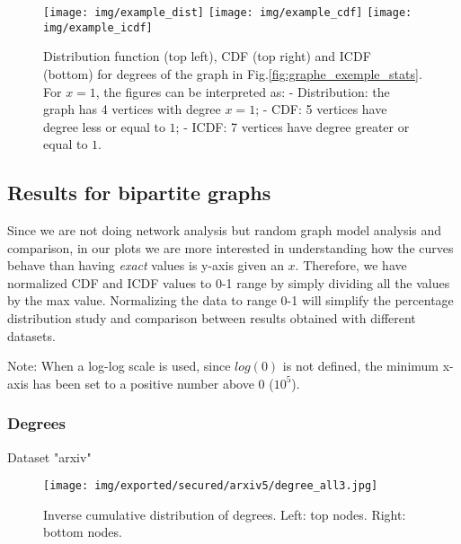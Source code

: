 \documentclass[table]{report}
\begin{document}
\begin{figure}[htp]
\centering
\texttt{[image: img/example\_dist]}\hfill
\texttt{[image: img/example\_cdf]}\hfill
\texttt{[image: img/example\_icdf]}

\caption{Distribution function (top left), CDF (top right) and ICDF (bottom) for degrees of the graph in Fig.\ref{fig:graphe_exemple_stats}. For $x=1$, the figures can be interpreted as: - Distribution: the graph has 4 vertices with degree $x=1$; - CDF: 5 vertices have degree less or equal to $1$; - ICDF: 7 vertices have degree greater or equal to $1$. }
\label{fig:figure3}

\end{figure}

\newpage
\subsection{Results for bipartite graphs}

Since we are not doing network analysis but random graph model analysis and comparison, in our plots we are more interested in understanding how the curves behave than having \textit{exact} values is y-axis given an $x$. Therefore, we have normalized CDF and ICDF values to 0-1 range by simply dividing all the values by the max value. Normalizing the data to range 0-1 will simplify the percentage distribution study and comparison between results obtained with different datasets. 

Note: When a log-log scale is used, since $log(0)$ is not defined, the minimum x-axis has been set to a positive number above 0 ($10^{5}$).

\subsubsection{Degrees}


Dataset "arxiv"



\begin{figure}[h]%
\centering
\texttt{[image: img/exported/secured/arxiv5/degree\_all3.jpg]}
\caption{Inverse cumulative distribution of degrees. Left: top nodes. Right: bottom nodes.}
\label{fig:degree_all}
\end{figure}
\FloatBarrier
\end{document}
